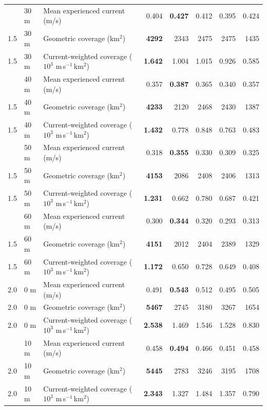\documentclass[a4paper,fleqn]{cas-dc}
\begin{document}
\begin{table}[p]
\begin{tabularx}{\textwidth}{@{}l@{\hspace{0.8em}}lXrrrrr@{}}
\addlinespace[1.0pt]
1.5 & 30 m & Mean experienced current (m/s) & 0.404 & \textbf{0.427} & 0.412 & 0.395 & 0.424 \\
1.5 & 30 m & Geometric coverage (km$^2$) & \textbf{4292} & 2343 & 2475 & 2475 & 1435 \\
1.5 & 30 m & Current-weighted coverage ($10^3$ m\,s$^{-1}$\,km$^2$) & \textbf{1.642} & 1.004 & 1.015 & 0.926 & 0.585 \\
\addlinespace[1.0pt]
1.5 & 40 m & Mean experienced current (m/s) & 0.357 & \textbf{0.387} & 0.365 & 0.340 & 0.357 \\
1.5 & 40 m & Geometric coverage (km$^2$) & \textbf{4233} & 2120 & 2468 & 2430 & 1387 \\
1.5 & 40 m & Current-weighted coverage ($10^3$ m\,s$^{-1}$\,km$^2$) & \textbf{1.432} & 0.778 & 0.848 & 0.763 & 0.483 \\
\addlinespace[1.0pt]
1.5 & 50 m & Mean experienced current (m/s) & 0.318 & \textbf{0.355} & 0.330 & 0.309 & 0.325 \\
1.5 & 50 m & Geometric coverage (km$^2$) & \textbf{4153} & 2086 & 2408 & 2406 & 1313 \\
1.5 & 50 m & Current-weighted coverage ($10^3$ m\,s$^{-1}$\,km$^2$) & \textbf{1.231} & 0.662 & 0.780 & 0.687 & 0.421 \\
\addlinespace[1.0pt]
1.5 & 60 m & Mean experienced current (m/s) & 0.300 & \textbf{0.344} & 0.320 & 0.293 & 0.313 \\
1.5 & 60 m & Geometric coverage (km$^2$) & \textbf{4151} & 2012 & 2404 & 2389 & 1329 \\
1.5 & 60 m & Current-weighted coverage ($10^3$ m\,s$^{-1}$\,km$^2$) & \textbf{1.172} & 0.650 & 0.728 & 0.649 & 0.408 \\
\midrule
2.0 & 0 m & Mean experienced current (m/s) & 0.491 & \textbf{0.543} & 0.512 & 0.495 & 0.505 \\
2.0 & 0 m & Geometric coverage (km$^2$) & \textbf{5467} & 2745 & 3180 & 3267 & 1654 \\
2.0 & 0 m & Current-weighted coverage ($10^3$ m\,s$^{-1}$\,km$^2$) & \textbf{2.538} & 1.469 & 1.546 & 1.528 & 0.830 \\
\addlinespace[1.0pt]
2.0 & 10 m & Mean experienced current (m/s) & 0.458 & \textbf{0.494} & 0.466 & 0.451 & 0.458 \\
2.0 & 10 m & Geometric coverage (km$^2$) & \textbf{5445} & 2783 & 3246 & 3195 & 1708 \\
2.0 & 10 m & Current-weighted coverage ($10^3$ m\,s$^{-1}$\,km$^2$) & \textbf{2.343} & 1.327 & 1.484 & 1.357 & 0.790 \\

\end{tabularx}
\end{table}
\end{document}
